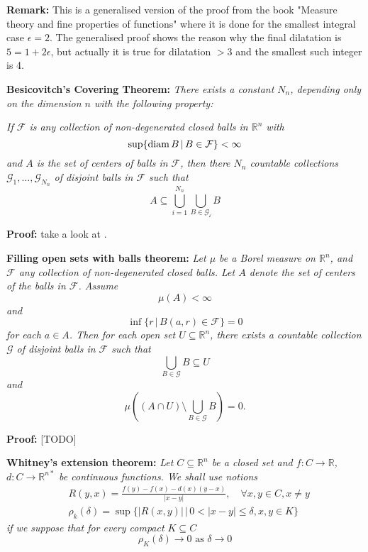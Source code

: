 \documentclass{article}
\begin{document}
\vspace{1ex}
\textbf{Remark:} This is a generalised version of the proof from the book
"Measure theory and fine properties of functions" where it is done for the
smallest integral case $\epsilon = 2$. The generalised proof shows the reason
why the final dilatation is $5 = 1+2\epsilon$, but actually it is true for
dilatation $>3$ and the smallest such integer is 4.


\vspace{2ex}
\textbf{Besicovitch’s Covering Theorem:} \textit{There exists a constant $N_n$, depending
only on the dimension $n$ with the following property:}

\vspace{1ex} \textit{
If $\mathcal{F}$ is any collection of non-degenerated closed balls in
$\mathbb{R}^n$ with
\[\sup\{\textnormal{diam}\,B\,|\,B\in\mathcal F\}<\infty\]
and $A$ is the set of centers of balls in $\mathcal F$, then there $N_n$
countable collections $\mathcal{G}_1,\ldots,\mathcal{G}_{N_n}$ of disjoint
balls in $\mathcal{F}$ such that
\[A\subseteq\bigcup_{i=1}^{N_n}\bigcup_{B\in\mathcal{G_i}}B\]}

\vspace{1ex}
\textbf{Proof:} take a look at \cite{evans_gariepy}.

\vspace{2ex}
\textbf{Filling open sets with balls theorem:} \textit{Let $\mu$ be a Borel measure on
$\mathbb{R}^n$, and $\mathcal{F}$ any collection of non-degenerated closed balls.
Let $A$ denote the set of centers of the balls in $\mathcal F$. Assume
\[\mu(A)<\infty\]
and
\[\inf\{r\,|\,B(a,r)\in\mathcal F\}=0\]
for each $a\in A$. Then for each open set $U\subseteq\mathbb{R}^n$, there
exists a countable collection $\mathcal G$ of disjoint balls in $\mathcal F$ such that
\[\bigcup_{B\in\mathcal G} B\subseteq U\]
and
\[\mu\left((A\cap U)\setminus\bigcup_{B\in\mathcal G}B\right)=0.\]}

\vspace{1ex}
\textbf{Proof:} [TODO]

\vspace{2ex}
\textbf{Whitney's extension theorem:}\textit{
Let $C\subseteq \mathbb{R}^n$ be a closed set and $f:C\rightarrow\mathbb R$,
$d:C\rightarrow\mathbb{R}^{n*}$ be continuous functions. We shall use notions}
\begin{align*}
    &R(y,x)=\frac{f(y)-f(x)-d(x)(y-x)}{|x-y|},\quad\forall x,y\in C, x\neq y \\
    &\rho_k(\delta)=\sup\{|R(x,y)|\, |\, 0<|x-y|\leq\delta, x, y\in K\}
\end{align*}
\textit{if we suppose that for every compact $K\subseteq C$}
\begin{equation}
\rho_K(\delta)\rightarrow 0\text{ as }\delta\rightarrow 0
\end{equation}
\end{document}

